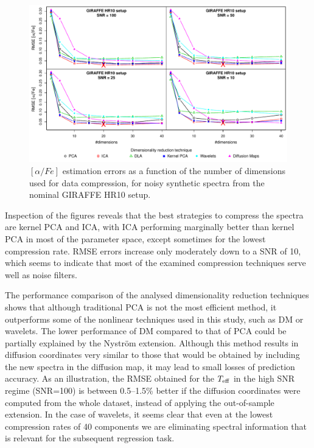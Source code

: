 \documentclass[a4paper,fleqn,usenatbib]{mnras}
\begin{document}
{{{\begin{figure}
\centering\includegraphics[width=\textwidth]{flamesHR10_AlFe_BestSVM_N-RMSE_test.pdf}
\caption{$\left[ \alpha/Fe \right]$ estimation errors as a function of the number of
  dimensions used for data compression, for noisy synthetic
  spectra from the nominal GIRAFFE HR10 setup.}
\label{fig:07}
\end{figure}

Inspection of the figures reveals that the best strategies to compress
the spectra are kernel PCA and ICA, with ICA performing marginally 
better than kernel PCA in most of the parameter space, except sometimes for the lowest
compression rate. RMSE errors increase only moderately down to a SNR
of 10, which seems to indicate that most of the examined compression
techniques serve well as noise filters.

The performance comparison of the analysed dimensionality reduction
techniques shows that although traditional PCA is not the most
efficient method, it outperforms some of the nonlinear techniques used
in this study, such as DM or wavelets. %
The lower performance of DM compared to that of PCA  could be partially explained by the 
Nystr\"{o}m extension. Although this method results in diffusion coordinates 
very similar to those that would be obtained by including the new spectra in 
the diffusion map, it may lead to small losses of 
prediction accuracy. As an illustration, the RMSE obtained for the 
$T_{\rm eff}$ in the high SNR regime (SNR=100) is between {0.5}--{1.5}\% 
better if the diffusion coordinates were computed 
from the whole dataset, instead of applying the out-of-sample extension.
In the case of wavelets, it seems clear that even at the lowest 
compression rates of 40 components we are eliminating
spectral information that is relevant for the subsequent regression task. 

}}}
\end{document}
